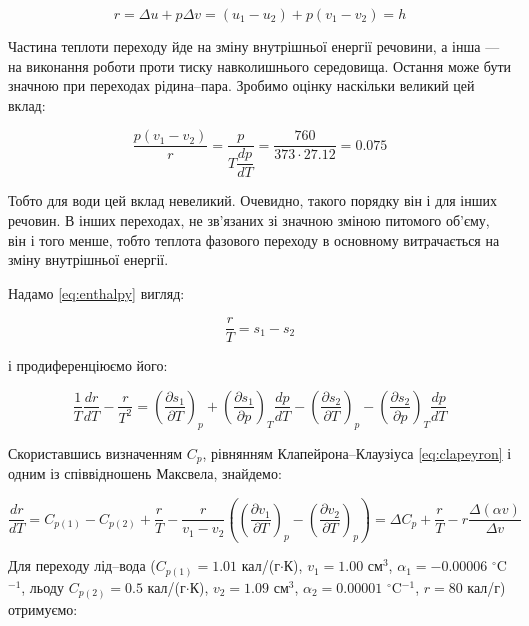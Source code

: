 \begin{equation}\label{eq:enthalpy}
r = \Delta u + p\Delta v = \left( u_1 - u_2 \right) + p\left( v_1 - v_2 \right) = h
\end{equation}

Частина теплоти переходу йде на зміну внутрішньої енергії речовини, а інша --- на виконання роботи
проти тиску навколишнього середовища. Остання може бути значною при переходах рідина--пара. Зробимо
оцінку наскільки великий цей вклад:

\begin{equation}\label{eq:work_ratio}
\frac{p(v_1 - v_2)}{r} = \frac{p}{T\dfrac{dp}{dT}} = \frac{760}{373 \cdot 27.12} = 0.075
\end{equation}

Тобто для води цей вклад невеликий. Очевидно, такого порядку він і для інших речовин. В інших
переходах, не зв'язаних зі значною зміною питомого об'єму, він і того менше, тобто теплота фазового
переходу в основному витрачається на зміну внутрішньої енергії.

Надамо \eqref{eq:enthalpy} вигляд:

\begin{equation}\label{eq:entropy_diff}
\frac{r}{T} = s_1 - s_2
\end{equation}

і продиференціюємо його:

\begin{equation}\label{eq:diff_entropy}
\frac{1}{T}\frac{dr}{dT} - \frac{r}{T^2} = \left( \frac{\partial s_1}{\partial T} \right)_p + \left(
\frac{\partial s_1}{\partial p} \right)_T \frac{dp}{dT} - \left( \frac{\partial s_2}{\partial T}
\right)_p - \left( \frac{\partial s_2}{\partial p} \right)_T \frac{dp}{dT}
\end{equation}

Скориставшись визначенням $C_p$, рівнянням Клапейрона--Клаузіуса \eqref{eq:clapeyron} і одним із
співвідношень Максвела, знайдемо:

\begin{equation}\label{eq:dr_dT_full}
\frac{dr}{dT} = C_{p(1)} - C_{p(2)} + \frac{r}{T} - \frac{r}{v_1 - v_2}\left( \left( \frac{\partial
v_1}{\partial T} \right)_p - \left( \frac{\partial v_2}{\partial T} \right)_p \right) = \Delta C_p +
\frac{r}{T} - r\frac{\Delta(\alpha v)}{\Delta v}
\end{equation}

Для переходу лід--вода ($C_{p(1)} = 1.01$ кал/(г$\cdot$К), $v_1 = 1.00$ см$^3$, $\alpha_1 = -0.00006$
$^\circ$C$^{-1}$, льоду $C_{p(2)} = 0.5$ кал/(г$\cdot$К), $v_2 = 1.09$ см$^3$, $\alpha_2 = 0.00001$
$^\circ$C$^{-1}$, $r = 80$ кал/г) отримуємо:

